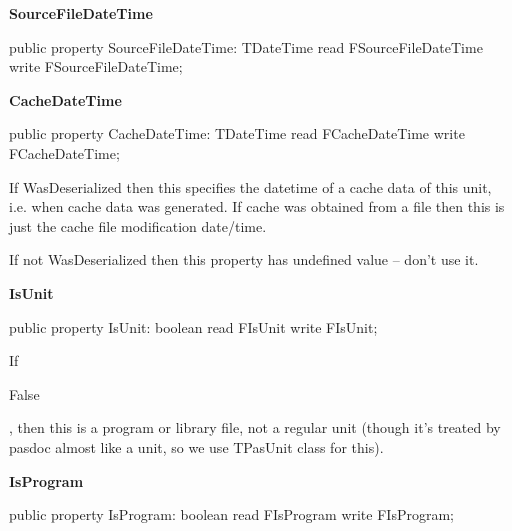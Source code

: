 \documentclass{report}
\newif\ifpdf
\begin{document}
\begin{list}{}
\begin{flushleft}
\ifpdf
\end{flushleft}
\fi


\par  \label{PasDoc_Items.TPasUnit-SourceFileDateTime}
\item[\textbf{SourceFileDateTime}\hfill]
\ifpdf
\begin{flushleft}
\fi
\begin{ttfamily}
public property SourceFileDateTime: TDateTime
      read FSourceFileDateTime write FSourceFileDateTime;\end{ttfamily}

\ifpdf
\end{flushleft}
\fi


\par  \label{PasDoc_Items.TPasUnit-CacheDateTime}
\item[\textbf{CacheDateTime}\hfill]
\ifpdf
\begin{flushleft}
\fi
\begin{ttfamily}
public property CacheDateTime: TDateTime
      read FCacheDateTime write FCacheDateTime;\end{ttfamily}

\ifpdf
\end{flushleft}
\fi


\par If WasDeserialized then this specifies the datetime of a cache data of this unit, i.e. when cache data was generated. If cache was obtained from a file then this is just the cache file modification date/time.

If not WasDeserialized then this property has undefined value -- don't use it.\label{PasDoc_Items.TPasUnit-IsUnit}
\item[\textbf{IsUnit}\hfill]
\ifpdf
\begin{flushleft}
\fi
\begin{ttfamily}
public property IsUnit: boolean read FIsUnit write FIsUnit;\end{ttfamily}

\ifpdf
\end{flushleft}
\fi


\par If \begin{ttfamily}False\end{ttfamily}, then this is a program or library file, not a regular unit (though it's treated by pasdoc almost like a unit, so we use TPasUnit class for this).\label{PasDoc_Items.TPasUnit-IsProgram}
\item[\textbf{IsProgram}\hfill]
\ifpdf
\begin{flushleft}
\fi
\begin{ttfamily}
public property IsProgram: boolean read FIsProgram write FIsProgram;\end{ttfamily}

\ifpdf
\end{flushleft}
\fi


\par  \end{list}
\end{document}
